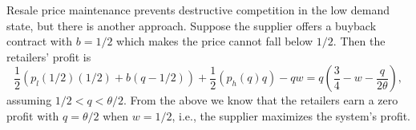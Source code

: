 Resale price maintenance prevents destructive competition in the low demand state, but there is another approach. Suppose the supplier offers a buyback contract with $b=1/2$ which makes the price cannot fall below $1/2$. Then the retailers' profit is 
\begin{equation*}
    \frac{1}{2}\left(p_l(1/2)(1/2)+b(q-1/2)\right)+\frac{1}{2}(p_h(q)q)-qw=q\left(\frac{3}{4}-w-\frac{q}{2\theta}\right),
\end{equation*} 
assuming $1/2<q<\theta/2$. From the above we know that the retailers earn a zero profit with $q=\theta/2$ when $w=1/2$, i.e., the supplier maximizes the system's profit.  







